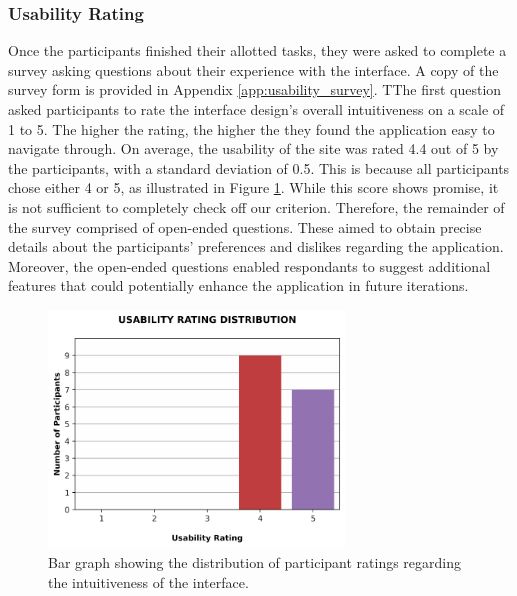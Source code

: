 \documentclass{l4proj}
\begin{document}
\subsubsection{Usability Rating}
Once the participants finished their allotted tasks, they were asked to complete a survey asking questions about their experience with the interface. A copy of the survey form is provided in Appendix \ref{app:usability_survey}. TThe first question asked participants to rate the interface design's overall intuitiveness on a scale of 1 to 5. The higher the rating, the higher the they found the application easy to navigate through. On average, the usability of the site was rated 4.4 out of 5 by the participants, with a standard deviation of 0.5. This is because all participants chose either 4 or 5, as illustrated in Figure \ref{fig:rating_distribution}. While this score shows promise, it is not sufficient to completely check off our criterion. Therefore, the remainder of the survey comprised of open-ended questions. These aimed to obtain precise details about the participants' preferences and dislikes regarding the application. Moreover, the open-ended questions enabled respondants to suggest additional features that could potentially enhance the application in future iterations.

\begin{figure}
    \centering
    \includegraphics[width=0.7\textwidth]{figures/rating_distribution.pdf}
    \caption{Bar graph showing the distribution of participant ratings regarding the intuitiveness of the interface.}
    \label{fig:rating_distribution}
\end{figure}
\end{document}

